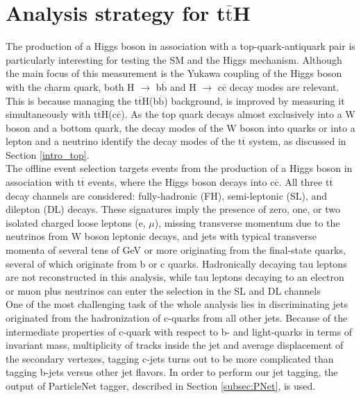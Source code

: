 \section{\label{sec:analysis_ttH}Analysis strategy for t$\overline{\text{t}}$H}
\noindent The production of a Higgs boson in association with a top-quark-antiquark pair is particularly interesting for testing the SM and the Higgs mechanism. Although the main focus of this measurement is the Yukawa coupling of the Higgs boson with the charm quark, both H $\rightarrow$ b$\overline{\text{b}}$ and H $\rightarrow$ c$\overline{\text{c}}$ decay modes are relevant. This is because managing the t$\overline{\text{t}}$H(b$\overline{\text{b}}$) background, is improved by measuring it simultaneously with t$\overline{\text{t}}$H(c$\overline{\text{c}}$). As the top quark decays almost exclusively into a W boson and a bottom quark, the decay modes of the W boson into quarks or into a lepton and a neutrino identify the decay modes of the t$\overline{\text{t}}$ system, as discussed in Section \ref{intro_top}.\\
\indent The offline event selection targets events from the production of a Higgs boson in association with t$\overline{\text{t}}$ events, where the Higgs boson decays into c$\overline{\text{c}}$. All three t$\overline{\text{t}}$ decay channels are considered: fully-hadronic (FH), semi-leptonic (SL), and dilepton (DL) decays. These signatures imply the presence of zero, one, or two isolated charged loose leptons (e, $\mu$), missing transverse momentum due to the neutrinos from W boson leptonic decays, and jets with typical transverse momenta of several tens of GeV or more originating from the final-state quarks, several of which originate from b or c quarks. Hadronically decaying tau leptons are not reconstructed in this analysis, while tau leptons decaying to an electron or muon plus neutrinos can enter the selection in the SL and
DL channels\\
\indent One of the most challenging task of the whole analysis lies in discriminating jets originated from the hadronization of c-quarks from all other jets. Because of the intermediate properties of c-quark with respect to b- and light-quarks in terms of invariant mass, multiplicity of tracks inside the jet and average displacement of the secondary vertexes, tagging c-jets turns out to be more complicated than tagging b-jets versus other jet flavors. In order to perform our jet tagging, the output of ParticleNet \cite{ParticleNet} tagger, described in Section \ref{subsec:PNet}, is used.\\
